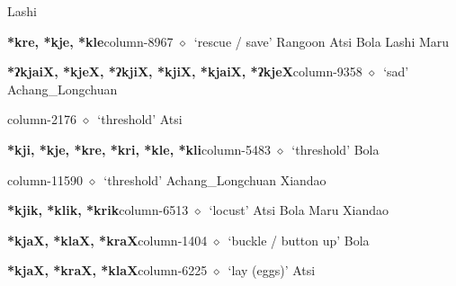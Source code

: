 \hspace{1ex}
         Lashi 
  \item {\footnotesize \textbf{*kre, *kje, *kle}}{\tiny column-8967}
         $\diamond$~`rescue / save'
         Rangoon 
\hspace{1ex}
         Atsi 
\hspace{1ex}
         Bola 
\hspace{1ex}
         Lashi 
\hspace{1ex}
         Maru 
  \item {\footnotesize \textbf{*ʔkjaiX, *kjeX, *ʔkjiX, *kjiX, *kjaiX, *ʔkjeX}}{\tiny column-9358}
         $\diamond$~`sad'
         Achang\_Longchuan 
  \item {\footnotesize \textbf{}}{\tiny column-2176}
         $\diamond$~`threshold'
         Atsi 
  \item {\footnotesize \textbf{*kji, *kje, *kre, *kri, *kle, *kli}}{\tiny column-5483}
         $\diamond$~`threshold'
         Bola 
  \item {\footnotesize \textbf{}}{\tiny column-11590}
         $\diamond$~`threshold'
         Achang\_Longchuan 
\hspace{1ex}
         Xiandao 
  \item {\footnotesize \textbf{*kjik, *klik, *krik}}{\tiny column-6513}
         $\diamond$~`locust'
         Atsi 
\hspace{1ex}
         Bola 
\hspace{1ex}
         Maru 
\hspace{1ex}
         Xiandao 
  \item {\footnotesize \textbf{*kjaX, *klaX, *kraX}}{\tiny column-1404}
         $\diamond$~`buckle / button up'
         Bola 
  \item {\footnotesize \textbf{*kjaX, *kraX, *klaX}}{\tiny column-6225}
         $\diamond$~`lay (eggs)'
         Atsi 
\hspace{1ex}
